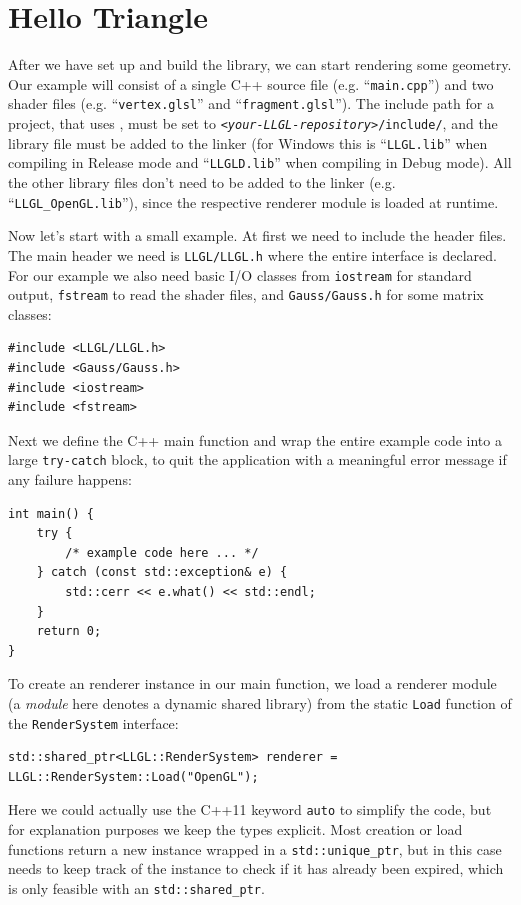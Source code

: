 \documentclass{article}
\begin{document}

\newpage

\section*{Hello Triangle}

After we have set up and build the library, we can start rendering some geometry.
Our example will consist of a single C++ source file (e.g. ``\texttt{main.cpp}'') and two shader files
(e.g. ``\texttt{vertex.glsl}'' and ``\texttt{fragment.glsl}'').
The include path for a project, that uses \LLGL, must be set to \texttt{\textit{<your-LLGL-repository>}/include/},
and the \LLGL library file must be added to the linker (for Windows this is ``\texttt{LLGL.lib}''
when compiling in Release mode and ``\texttt{LLGLD.lib}'' when compiling in Debug mode).
All the other library files don't need to be added to the linker (e.g. ``\texttt{LLGL\_OpenGL.lib}''),
since the respective renderer module is loaded at runtime.

Now let's start with a small example. At first we need to include the header files.
The main header we need is \texttt{LLGL/LLGL.h} where the entire \LLGL interface is declared.
For our example we also need basic I/O classes from \texttt{iostream} for standard output, \texttt{fstream}
to read the shader files, and \texttt{Gauss/Gauss.h} for some matrix classes:
\begin{lstlisting}
#include <LLGL/LLGL.h>
#include <Gauss/Gauss.h>
#include <iostream>
#include <fstream>
\end{lstlisting}
Next we define the C++ main function and wrap the entire example code into a large \texttt{try-catch} block,
to quit the application with a meaningful error message if any failure happens:
\begin{lstlisting}
int main() {
    try {
        /* example code here ... */
    } catch (const std::exception& e) {
        std::cerr << e.what() << std::endl;
    }
    return 0;
}
\end{lstlisting}
To create an \LLGL renderer instance in our main function, we load a renderer module
(a \textit{module} here denotes a dynamic shared library)
from the static \texttt{Load} function of the \texttt{RenderSystem} interface:
\begin{lstlisting}
std::shared_ptr<LLGL::RenderSystem> renderer = LLGL::RenderSystem::Load("OpenGL");
\end{lstlisting}
Here we could actually use the C++11 keyword \texttt{auto} to simplify the code,
but for explanation purposes we keep the types explicit.
Most creation or load functions return a new instance wrapped in a \texttt{std::unique\_ptr},
but in this case \LLGL needs to keep track of the instance to check if it has already been expired,
which is only feasible with an \texttt{std::shared\_ptr}.
\end{document}

